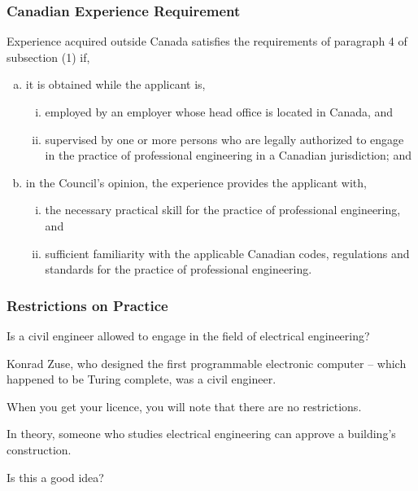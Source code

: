 \begin{frame}
\frametitle{Canadian Experience Requirement}


Experience acquired outside Canada satisfies the requirements of paragraph 4 of subsection (1) if,

\begin{enumerate}[(a)]
\item it is obtained while the applicant is,

\begin{enumerate}[i)]
\item employed by an employer whose head office is located in Canada, and

\item supervised by one or more persons who are legally authorized to engage in the practice of professional engineering in a Canadian jurisdiction; and
\end{enumerate}

\item in the Council's opinion, the experience provides the applicant with,

\begin{enumerate}[i)]
\item the necessary practical skill for the practice of professional engineering, and

\item sufficient familiarity with the applicable Canadian codes, regulations and standards for the practice of professional engineering.
\end{enumerate}

\end{enumerate}

\end{frame}



\begin{frame}
\frametitle{Restrictions on Practice}

Is a civil engineer allowed to engage in the field of electrical engineering?


Konrad Zuse, who designed the first programmable electronic computer  -- which happened to be Turing complete, was a civil engineer.

When you get your licence, you will note that there are no restrictions.

In theory, someone who studies electrical engineering can approve a building's construction. 

Is this a good idea?

\end{frame}



